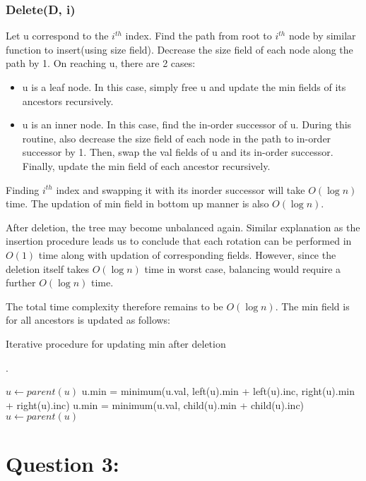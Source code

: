 \documentclass{article}
\begin{document}
\subsubsection{Delete(D, i)}
Let u correspond to the $i^{th}$ index. Find the path from root to $i^{th}$ node by similar function to insert(using size field). Decrease the size field of each node along the path by 1. On reaching u, there are 2 cases:
\begin{itemize}
	\item u is a leaf node. In this case, simply free u and update the min fields of its ancestors recursively.
	\item u is an inner node. In this case, find the in-order successor of u. During this routine, also decrease the size field of each node in the path to in-order successor by 1. Then, swap the val fields of u and its in-order successor. Finally, update the min field of each ancestor recursively.
\end{itemize} 

Finding $i^{th}$ index and swapping it with its inorder successor will take $O(\log n)$ time. The updation of min field in bottom up manner is also $O(\log n)$.
\par
After deletion, the tree may become unbalanced again. Similar explanation as the insertion procedure leads us to conclude that each rotation can be performed in $O(1)$ time along with updation of corresponding fields. However, since the deletion itself takes $O(\log n)$ time in worst case, balancing would require a further $O(\log n)$ time.
\par
The total time complexity therefore remains to be $O(\log n)$.
\newpage
The min field is for all ancestors is updated as follows:
\begin{algorithm}
	\caption{Iterative procedure for updating min after deletion}.
	\label{alg:update_min}
	\begin{algorithmic}
		\State $u \gets parent(u)$
			 
				\State u.min = minimum(u.val, left(u).min + left(u).inc, right(u).min + right(u).inc)
				\Else
				\State u.min = minimum(u.val, child(u).min + child(u).inc) 
			\EndIf
			$ u \gets parent(u) $
		\EndWhile	
		\EndFunction
	\end{algorithmic}
\end{algorithm}
\newpage
\section{Question 3:}
\end{document}
